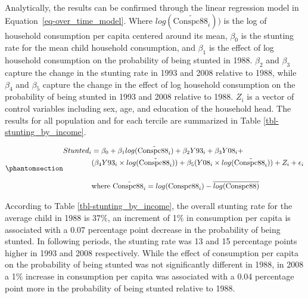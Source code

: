 \documentclass[
  letterpaper,
  DIV=11,
  numbers=noendperiod]{scrartcl}
\begin{document}
Analytically, the results can be confirmed through the linear regression
model in Equation~\ref{eq-over_time_model}. Where
\(log(\tilde{\text{Conspc88}_i}))\) is the log of household consumption
per capita centered around its mean, \(\beta_0\) is the stunting rate
for the mean child household consumption, and \(\beta_1\) is the effect
of log household consumption on the probability of being stunted in
1988. \(\beta_2\) and \(\beta_3\) capture the change in the stunting
rate in 1993 and 2008 relative to 1988, while \(\beta_4\) and
\(\beta_5\) capture the change in the effect of log household
consumption on the probability of being stunted in 1993 and 2008
relative to 1988. \(Z_i\) is a vector of control variables including
sex, age, and education of the household head. The results for all
population and for each tercile are summarized in Table
\ref{tbl-stunting_by_income}.

\begin{equation}\protect\phantomsection\label{eq-over_time_model}{
\begin{aligned}
Stunted_i & = \beta_0 + \beta_1 log(\tilde{\text{Conspc88}_i}) + \beta_2 Y93_i + \beta_3 Y08_i + \\
& (\beta_4 Y93_i \times log(\tilde{\text{Conspc88}_i})) + \beta_5 (Y08_i \times log(\tilde{\text{Conspc88}_i})) + Z_i + \epsilon_i\\\\
& \text{where } \tilde{\text{Conspc88}_i} = log(\text{Conspc88}_i) - \overline{log(\text{Conspc88})}
\end{aligned}
}\end{equation}

According to Table \ref{tbl-stunting_by_income}, the overall stunting
rate for the average child in 1988 is 37\%, an increment of 1\% in
consumption per capita is associated with a 0.07 percentage point
decrease in the probability of being stunted. In following periods, the
stunting rate was 13 and 15 percentage points higher in 1993 and 2008
respectively. While the effect of consumption per capita on the
probability of being stunted was not significantly different in 1988, in
2008 a 1\% increase in consumption per capita was associated with a 0.04
percentage point more in the probability of being stunted relative to
1988.
\end{document}

